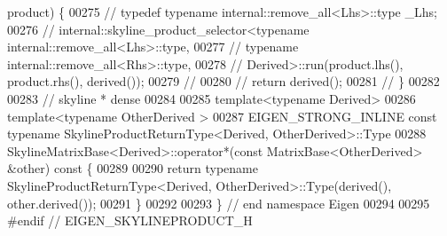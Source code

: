 \begin{DoxyCode}
{       product) \{}
00275 \textcolor{comment}{//     typedef typename internal::remove\_all<Lhs>::type \_Lhs;}
00276 \textcolor{comment}{//     internal::skyline\_product\_selector<typename internal::remove\_all<Lhs>::type,}
00277 \textcolor{comment}{//             typename internal::remove\_all<Rhs>::type,}
00278 \textcolor{comment}{//             Derived>::run(product.lhs(), product.rhs(), derived());}
00279 \textcolor{comment}{// }
00280 \textcolor{comment}{//     return derived();}
00281 \textcolor{comment}{// \}}
00282 
00283 \textcolor{comment}{// skyline * dense}
00284 
00285 \textcolor{keyword}{template}<\textcolor{keyword}{typename} Derived>
00286 \textcolor{keyword}{template}<\textcolor{keyword}{typename} OtherDerived >
00287 EIGEN\_STRONG\_INLINE \textcolor{keyword}{const} \textcolor{keyword}{typename} SkylineProductReturnType<Derived, OtherDerived>::Type
00288 SkylineMatrixBase<Derived>::operator*(\textcolor{keyword}{const} MatrixBase<OtherDerived> &other)\textcolor{keyword}{ const }\{
00289 
00290     \textcolor{keywordflow}{return} \textcolor{keyword}{typename} SkylineProductReturnType<Derived, OtherDerived>::Type(derived(), other.derived());
00291 \}
00292 
00293 \} \textcolor{comment}{// end namespace Eigen}
00294 
00295 \textcolor{preprocessor}{#endif // EIGEN\_SKYLINEPRODUCT\_H}
\end{DoxyCode}
